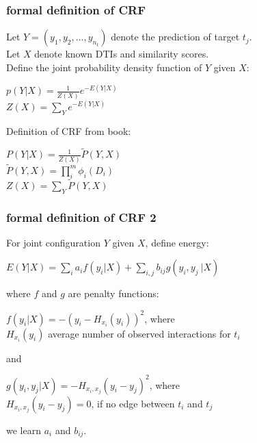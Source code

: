 \documentclass[11pt]{beamer}
\begin{document}
\begin{frame}
\frametitle{formal definition of CRF}
Let $Y=(y_1, y_2, \dots, y_{n_t})$ denote the prediction of target $t_j$.\\
Let $X$ denote known DTIs and similarity scores.\\
Define the joint probability density function of $Y$ given $X$:
\begin{center}
$p(Y|X)=\frac{1}{Z(X)}e^{-E(Y|X)}$\\
\pause
$Z(X)=\sum_Y e^{-E(Y|X)}$
\end{center}
\pause
Definition of CRF from book:
\begin{center}
$P(Y|X)=\frac{1}{Z(X)}\tilde{P}(Y,X)$\\
$\tilde{P}(Y,X)=\prod\limits_i^m\phi_i(D_i)$\\
$Z(X)=\sum_Y \tilde{P}(Y,X)$
\end{center}
\end{frame}



\begin{frame}
\frametitle{formal definition of CRF 2}
For joint configuration $Y$ given $X$, define energy:
\begin{center}
$E(Y|X)=\sum\limits_i a_i f(y_i|X) + \sum\limits_{i,j} b_{ij} g(y_i, y_j~|X)$
\end{center}
where $f$ and $g$ are penalty functions:
\begin{center}
$f(y_i|X) = -(y_i -H_{x_i}(y_i))^2$, where\\
$H_{x_i}(y_i)$ average number of observed interactions for $t_i$\\
\end{center}
\pause
and
\begin{center}
$g(y_i,y_j|X) = -H_{x_i,x_j}(y_i-y_j)^2$, where \\
$H_{x_i, x_j}(y_i-y_j) = 0$, if no edge between $t_i$ and $t_j$
\end{center}
we learn $a_i$ and $b_{ij}$.
\end{frame}
\end{document}

